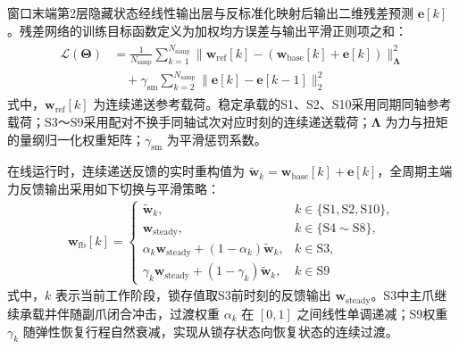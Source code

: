 \documentclass{JQRnew}
\begin{document}
窗口末端第2层隐藏状态经线性输出层与反标准化映射后输出二维残差预测 $\bm{e}[k]$。残差网络的训练目标函数定义为加权均方误差与输出平滑正则项之和：
\begin{align}
	\label{eq15}
	\begin{aligned}
		\mathcal{L}(\bm{\Theta}) &= \frac{1}{N_{\text{samp}}}\sum_{k=1}^{N_{\text{samp}}} \|\bm{w}_{\text{ref}}[k] - (\bm{w}_{\text{base}}[k] + \bm{e}[k])\|_{\bm{\Lambda}}^2 \\
		&\quad + \gamma_{\text{sm}}\sum_{k=2}^{N_{\text{samp}}}\|\bm{e}[k] - \bm{e}[k-1]\|_2^2
	\end{aligned}
\end{align}
式中，$\bm{w}_{\text{ref}}[k]$ 为连续递送参考载荷。稳定承载的S1、S2、S10采用同期同轴参考载荷；S3～S9采用配对不换手同轴试次对应时刻的连续递送载荷；$\bm{\Lambda}$ 为力与扭矩的量纲归一化权重矩阵；$\gamma_{\text{sm}}$ 为平滑惩罚系数。

在线运行时，连续递送反馈的实时重构值为 $\widetilde{\bm{w}}_k = \bm{w}_{\text{base}}[k] + \bm{e}[k]$，全周期主端力反馈输出采用如下切换与平滑策略：
\begin{align}
	\label{eq16}
	\bm{w}_{\text{fb}}[k] =
	\begin{cases}
		\widetilde{\bm{w}}_k, & k \in \{\text{S1},\text{S2},\text{S10}\}, \\
		\bm{w}_{\text{steady}}, & k \in \{\text{S4}\sim\text{S8}\}, \\
		\alpha_k \bm{w}_{\text{steady}} + (1 - \alpha_k)\widetilde{\bm{w}}_k, & k \in \text{S3}, \\
		\gamma_k \bm{w}_{\text{steady}} + (1 - \gamma_k)\widetilde{\bm{w}}_k, & k \in \text{S9}
	\end{cases}
\end{align}
式中，$k$ 表示当前工作阶段，锁存值取S3前时刻的反馈输出 $\bm{w}_{\text{steady}}$。S3中主爪继续承载并伴随副爪闭合冲击，过渡权重 $\alpha_k$ 在 $[0,1]$ 之间线性单调递减；S9权重 $\gamma_k$ 随弹性恢复行程自然衰减，实现从锁存状态向恢复状态的连续过渡。

\begin{figure}[h!t]
	\centering
	\label{fig3}
\end{figure}
\end{document}
